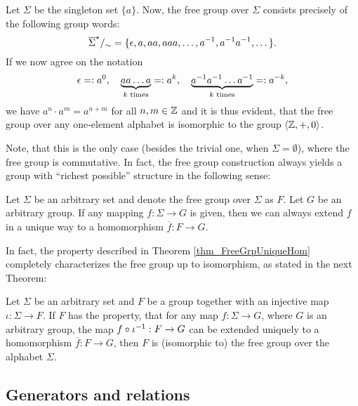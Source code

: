 \begin{example}
Let $\Sigma$ be the singleton set $\{a\}$. Now, the free group over $\Sigma$ consists precisely of the following group words:
\begin{equation*}
{\overline{\Sigma}}^{\star}/_{\sim} = \{\epsilon, a, aa, aaa, \dots, {a}^{-1}, {a}^{-1}{a}^{-1},\dots\}.
\end{equation*}
If we now agree on the notation
\begin{equation*}
\epsilon =: a^0, \quad 
\underbrace{a a \dots a}_{k \text{ times}} =: a^k, \quad
\underbrace{{a}^{-1} {a}^{-1} \dots {a}^{-1}}_{k \text{ times}} =: a^{-k},
\end{equation*}
we have $a^n \cdot a^m = a^{n+m}$ for all $n,m \in \mathbb{Z}$ and it is thus evident, that the free group over any one-element alphabet is isomorphic to the group $\langle \mathbb{Z}, +, 0 \rangle$. 

Note, that this is the only case (besides the trivial one, when $\Sigma = \emptyset$), where the free group is commutative. In fact, the free group construction always yields a group with ``richest possible'' structure in the following sense:

\begin{theorem}
\label{thm_FreeGrpUniqueHom}
Let $\Sigma$ be an arbitrary set and denote the free group over $\Sigma$ as $F$. Let $G$ be an arbitrary group. If any mapping $f : \Sigma \to G$ is given, then we can always extend $f$ in a unique way to a homomorphism $\overline{f} : F \to G$.
\end{theorem}

In fact, the property described in Theorem \ref{thm_FreeGrpUniqueHom} completely characterizes the free group up to isomorphism, as stated in the next Theorem:

\begin{theorem}
\label{thm_FreeGrpUnivMapProp}
Let $\Sigma$ be an arbitrary set and $F$ be a group together with an injective map $\iota : \Sigma \to F$. If $F$ has the property, that for any map $f : \Sigma \to G$, where $G$ is an arbitrary group, the map $f \circ {\iota}^{-1}: F \to G$ can be extended uniquely to a homomorphism $\overline{f}: F \to G$, then $F$ is (isomorphic to) the free group over the alphabet $\Sigma$.
\end{theorem}

\end{example}

\subsection{Generators and relations}

